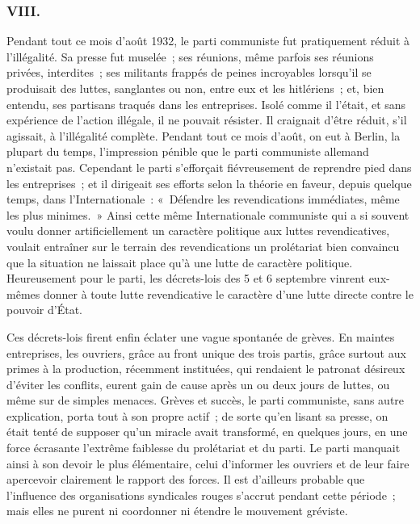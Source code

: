 \documentclass[french,twoside]{book} %
\begin{document}
\subsubsection[VIII.]{VIII.}
\noindent Pendant tout ce mois d'août 1932, le parti communiste fut pratiquement réduit à l'illégalité. Sa presse fut muselée ; ses réunions, même parfois ses réunions privées, interdites ; ses militants frappés de peines incroyables lorsqu'il se produisait des luttes, sanglantes ou non, entre eux et les hitlériens ; et, bien entendu, ses partisans traqués dans les entreprises. Isolé comme il l'était, et sans expérience de l'action illégale, il ne pouvait résister. Il craignait d'être réduit, s'il agissait, à l'illégalité complète. Pendant tout ce mois d'août, on eut à Berlin, la plupart du temps, l'impression pénible que le parti commu­niste allemand n'existait pas. Cependant le parti s'efforçait fiévreusement de reprendre pied dans les entreprises ; et il dirigeait ses efforts selon la théorie en faveur, depuis quelque temps, dans l'Internationale : « Défendre les revendications immédiates, même les plus minimes. » Ainsi cette même Internationale communiste qui a si souvent voulu donner artificiellement un caractère politique aux luttes revendicatives, voulait entraîner sur le terrain des revendications un prolétariat bien convaincu que la situation ne laissait place qu'à une lutte de caractère politique. Heureusement pour le parti, les décrets-lois des 5 et 6 septembre vinrent eux-mêmes donner à toute lutte revendicative le caractère d'une lutte directe contre le pouvoir d'État.\par
Ces décrets-lois firent enfin éclater une vague spontanée de grèves. En maintes entreprises, les ouvriers, grâce au front unique des trois partis, grâce surtout aux primes à la production, récemment instituées, qui rendaient le patronat désireux d'éviter les conflits, eurent gain de cause après un ou deux jours de luttes, ou même sur de simples menaces. Grèves et succès, le parti communiste, sans autre explication, porta tout à son propre actif ; de sorte qu'en lisant sa presse, on était tenté de supposer qu'un miracle avait transfor­mé, en quelques jours, en une force écrasante l'extrême faiblesse du prolétariat et du parti. Le parti manquait ainsi à son devoir le plus élémentaire, celui d'informer les ouvriers et de leur faire apercevoir clairement le rapport des forces. Il est d'ailleurs probable que l'influence des organisations syndicales rouges s'accrut pendant cette période ; mais elles ne purent ni coordonner ni étendre le mouvement gréviste.\par
\end{document}
